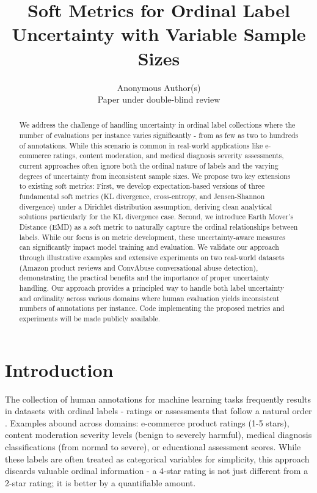 \documentclass[journal]{IEEEtran}
\title{Soft Metrics for Ordinal Label Uncertainty with Variable Sample Sizes}
\author{Anonymous Author(s)\\
Paper under double-blind review}
\begin{document}
\maketitle

\begin{abstract}
We address the challenge of handling uncertainty in ordinal label collections where the number of evaluations per instance varies significantly - from as few as two to hundreds of annotations. While this scenario is common in real-world applications like e-commerce ratings, content moderation, and medical diagnosis severity assessments, current approaches often ignore both the ordinal nature of labels and the varying degrees of uncertainty from inconsistent sample sizes. We propose two key extensions to existing soft metrics: First, we develop expectation-based versions of three fundamental soft metrics (KL divergence, cross-entropy, and Jensen-Shannon divergence) under a Dirichlet distribution assumption, deriving clean analytical solutions particularly for the KL divergence case. Second, we introduce Earth Mover's Distance (EMD) as a soft metric to naturally capture the ordinal relationships between labels. While our focus is on metric development, these uncertainty-aware measures can significantly impact model training and evaluation. We validate our approach through illustrative examples and extensive experiments on two real-world datasets (Amazon product reviews and ConvAbuse conversational abuse detection), demonstrating the practical benefits and the importance of proper uncertainty handling. Our approach provides a principled way to handle both label uncertainty and ordinality across various domains where human evaluation yields inconsistent numbers of annotations per instance. Code implementing the proposed metrics and experiments will be made publicly available.
\end{abstract}

\section{Introduction}
The collection of human annotations for machine learning tasks frequently results in datasets with ordinal labels - ratings or assessments that follow a natural order \cite{plank2022}. Examples abound across domains: e-commerce product ratings (1-5 stars), content moderation severity levels (benign to severely harmful), medical diagnosis classifications (from normal to severe), or educational assessment scores. While these labels are often treated as categorical variables for simplicity, this approach discards valuable ordinal information - a 4-star rating is not just different from a 2-star rating; it is better by a quantifiable amount.
\end{document}
